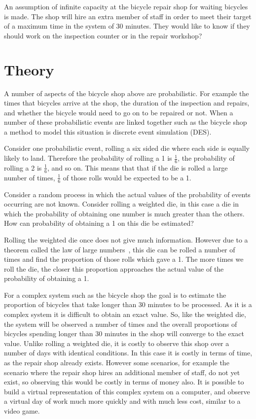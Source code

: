 An assumption of infinite capacity at the bicycle repair shop
for waiting bicycles is made.
The shop will hire an extra member of staff in order to meet their target of a
maximum time in the system of 30 minutes. They would like to know if they
should work on the inspection counter or in the repair workshop?

\section{Theory}\label{sec:discrete_event_simulation_theory}

A number of aspects of the bicycle shop above are
probabilistic. For example the
times that bicycles arrive at the shop, the duration of the inspection and
repairs, and whether the bicycle would need to go on to be repaired or not.
When a number of these probabilistic events are linked together
such as the bicycle shop a method to model this situation is
discrete event simulation (DES).

Consider one probabilistic event, rolling a six sided die where each side is
equally likely to land.  Therefore the probability of rolling a 1 is
\(\frac{1}{6}\), the probability of rolling a 2 is \(\frac{1}{6}\), and so on.
This means that that if the die is rolled a large number of times,
\(\frac{1}{6}\) of those rolls would be expected to be a 1.

Consider a random process in which the actual values of the probability
of events occurring are not known. Consider rolling a weighted die, in this case a
die in which the probability of obtaining one number is much greater than the
others. How can probability of obtaining a 1 on this die be estimated?

Rolling the weighted die once does not give much information.
However due to a theorem called the law of large numbers~\cite{stewart2009probability},
this die can be rolled a number of times
and find the proportion of those rolls which gave a 1. The more times we roll
the die, the closer this proportion approaches the actual value of the
probability of obtaining a 1.

For a complex system such as the bicycle shop the goal is to estimate the
proportion of bicycles that take longer than 30 minutes to be processed. As it
is a complex system it is difficult to obtain an exact value. So,
like the weighted die, the system will be observed a number of times and
the overall proportions
of bicycles spending longer than 30 minutes in the shop will converge to
the exact value.
Unlike rolling a weighted die, it is costly to observe this shop over a
number of days with identical conditions. In this case it is costly in terms of
time, as the repair shop already exists. However some scenarios, for example the
scenario where the repair shop hires an additional member of staff, do not yet
exist, so observing this would be costly in terms of money also.
It is possible to build a virtual representation of this complex system on a
computer, and observe a virtual day of work much more quickly and with much less
cost, similar to a video game.

